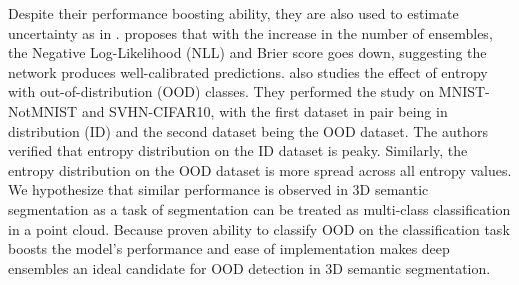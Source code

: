 Despite their performance boosting ability, they are also used to estimate uncertainty as in \cite{lakshminarayanan2016simple}.
\cite{lakshminarayanan2016simple} proposes that with the increase in the number of ensembles, the Negative Log-Likelihood (NLL) and Brier score goes down, suggesting the network produces well-calibrated predictions.
\cite{lakshminarayanan2016simple} also studies the effect of entropy with out-of-distribution (OOD) classes.
They performed the study on MNIST-NotMNIST and SVHN-CIFAR10, with the first dataset in pair being in distribution (ID) and the second dataset being the OOD dataset.
The authors verified that entropy distribution on the ID dataset is peaky. Similarly, the entropy distribution on the OOD dataset is more spread across all entropy values.
We hypothesize that similar performance is observed in 3D semantic segmentation as a task of segmentation can be treated as multi-class classification in a point cloud.
Because proven ability to classify OOD on the classification task boosts the model's performance and ease of implementation makes deep ensembles an ideal candidate for OOD detection in 3D semantic segmentation.

